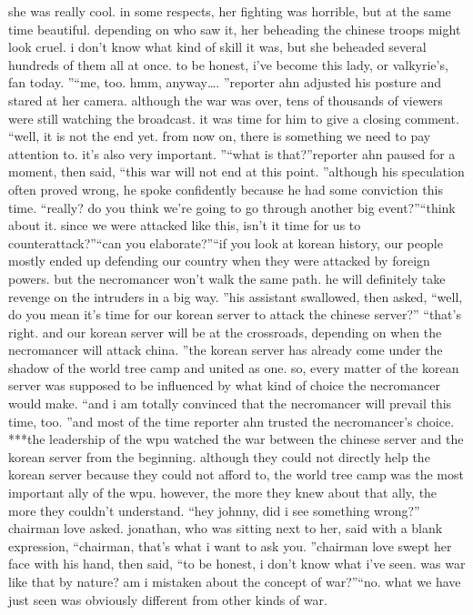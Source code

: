she was really cool.
 in some respects, her fighting was horrible, but at the same time beautiful.
 depending on who saw it, her beheading the chinese troops might look cruel.
 i don’t know what kind of skill it was, but she beheaded several hundreds of them all at once.
 to be honest, i’ve become this lady, or valkyrie’s, fan today.
”“me, too.
 hmm, anyway….
”reporter ahn adjusted his posture and stared at her camera.
 although the war was over, tens of thousands of viewers were still watching the broadcast.
 it was time for him to give a closing comment.
“well, it is not the end yet.
 from now on, there is something we need to pay attention to.
 it’s also very important.
”“what is that?”reporter ahn paused for a moment, then said, “this war will not end at this point.
”although his speculation often proved wrong, he spoke confidently because he had some conviction this time.
“really? do you think we’re going to go through another big event?”“think about it.
 since we were attacked like this, isn’t it time for us to counterattack?”“can you elaborate?”“if you look at korean history, our people mostly ended up defending our country when they were attacked by foreign powers.
 but the necromancer won’t walk the same path.
 he will definitely take revenge on the intruders in a big way.
”his assistant swallowed, then asked, “well, do you mean it’s time for our korean server to attack the chinese server?”
“that’s right.
 and our korean server will be at the crossroads, depending on when the necromancer will attack china.
”the korean server has already come under the shadow of the world tree camp and united as one.
 so, every matter of the korean server was supposed to be influenced by what kind of choice the necromancer would make.
“and i am totally convinced that the necromancer will prevail this time, too.
”and most of the time reporter ahn trusted the necromancer’s choice.
***the leadership of the wpu watched the war between the chinese server and the korean server from the beginning.
 although they could not directly help the korean server because they could not afford to, the world tree camp was the most important ally of the wpu.
however, the more they knew about that ally, the more they couldn’t understand.
“hey johnny, did i see something wrong?” chairman love asked.
jonathan, who was sitting next to her, said with a blank expression, “chairman, that’s what i want to ask you.
”chairman love swept her face with his hand, then said, “to be honest, i don’t know what i’ve seen.
 was war like that by nature? am i mistaken about the concept of war?”“no.
 what we have just seen was obviously different from other kinds of war.
